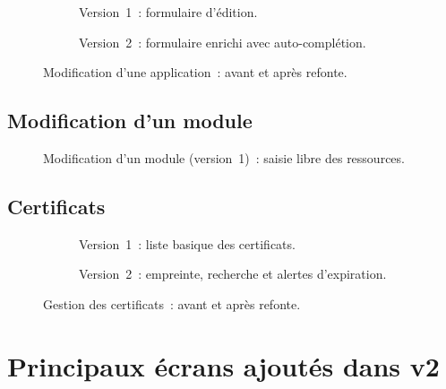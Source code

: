 \begin{figure}[H]
  \centering
  \begin{subfigure}[t]{0.48\textwidth}
    \centering
    \caption{Version~1~: formulaire d'édition.}
    \label{fig:v1-modif-app}
  \end{subfigure}
  \hfill
  \begin{subfigure}[t]{0.48\textwidth}
    \centering
    \caption{Version~2~: formulaire enrichi avec auto-complétion.}
    \label{fig:v2-modif-app}
  \end{subfigure}
  \caption{Modification d'une application~: avant et après refonte.}
  \label{fig:ann-modif-app}
\end{figure}

\subsection*{Modification d'un module}

\begin{figure}[H]
  \centering
  \caption{Modification d'un module (version~1)~: saisie libre des ressources.}
  \label{fig:ann-modif-module}
\end{figure}

\subsection*{Certificats}

\begin{figure}[H]
  \centering
  \begin{subfigure}[t]{0.48\textwidth}
    \centering
    \caption{Version~1~: liste basique des certificats.}
    \label{fig:v1-certificats}
  \end{subfigure}
  \hfill
  \begin{subfigure}[t]{0.48\textwidth}
    \centering
    \caption{Version~2~: empreinte, recherche et alertes d'expiration.}
    \label{fig:v2-certificats}
  \end{subfigure}
  \caption{Gestion des certificats~: avant et après refonte.}
  \label{fig:ann-certificats}
\end{figure}

\section{Principaux écrans ajoutés dans \csbag v2}
\label{ann:ecrans}

